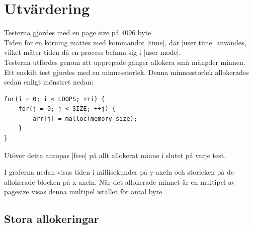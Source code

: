 \documentclass[paper=a4, fontsize=11pt]{scrartcl} %
\numberwithin{equation}{section} %
\numberwithin{figure}{section} %
\numberwithin{table}{section} %
\begin{document}
\section{Utvärdering}

Testerna gjordes med en page size på 4096 byte.\\

Tiden för en körning mättes med kommandot |time|, där |user time| användes,
vilket mäter tiden då en process befann sig i |user mode|.\\

Testerna utfördes genom att upprepade gånger allokera små mängder minnen.
Ett enskilt test gjordes med en minnesstorlek.
Denna minnesstorlek allokerades sedan enligt mönstret nedan:

\begin{verbatim}
for(i = 0; i < LOOPS; ++i) {
    for(j = 0; j < SIZE; ++j) {
        arr[j] = malloc(memory_size);
    }
}
\end{verbatim}

Utöver detta anropas |free| på allt allokerat minne i slutet på varje test.

I graferna nedan visas tiden i millisekunder på y-axeln och storleken på 
de allokerade blocken på x-axeln. När det allokerade minnet är en multipel
av pagesize visas denna multipel istället för antal byte.

\captionsetup{labelsep=newline}

\subsection{Stora allokeringar}
\end{document}
